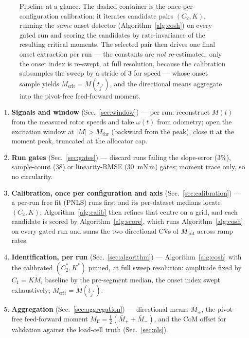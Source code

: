 \documentclass[10pt]{article}
\begin{document}
\begin{figure}[t]
\centering

\caption{Pipeline at a glance. The dashed container is the
once-per-configuration calibration: it iterates candidate pairs
$(C_2, K)$, running the \emph{same} onset detector
(Algorithm~\ref{alg:cosh}) on every gated run and scoring the
candidates by rate-invariance of the resulting critical moments. The
selected pair then drives one final onset extraction per run — the
constants are \emph{not} re-estimated; only the onset index is
re-swept, at full resolution, because the calibration subsamples the
sweep by a stride of $3$ for speed — whose onset sample yields
$M_{\mathrm{crit}} = M(t_{j^\ast})$, and the directional means
aggregate into the pivot-free feed-forward moment.}
\label{fig:flow}
\end{figure}

\begin{enumerate}
\item \textbf{Signals and window} (Sec.~\ref{sec:window}) — per run:
reconstruct $M(t)$ from the measured rotor speeds and take $\omega(t)$
from odometry; open the excitation window at
$|M| > M_{\mathrm{thr}}$ (backward from the peak), close it at the
moment peak, truncated at the allocator cap.
\item \textbf{Run gates} (Sec.~\ref{sec:gates}) — discard runs failing
the slope-error ($3\%$), sample-count ($38$) or linearity-RMSE
($30$~mN\,m) gates; moment trace only, so no circularity.
\item \textbf{Calibration, once per configuration and axis}
(Sec.~\ref{sec:calibration}) — a per-run free fit (PNLS) runs first and
its per-dataset medians locate $(C_2, K)$; Algorithm~\ref{alg:calib}
then refines that centre on a grid, and each candidate is scored by
Algorithm~\ref{alg:score}, which runs Algorithm~\ref{alg:cosh} on
every gated run and sums the two directional CVs of
$M_{\mathrm{crit}}$ across ramp rates.
\item \textbf{Identification, per run} (Sec.~\ref{sec:algorithm}) —
Algorithm~\ref{alg:cosh} with the calibrated $(C_2^\ast, K^\ast)$
pinned, at full sweep resolution: amplitude fixed by $C_1 = K\dot M$,
baseline by the pre-segment median, the onset index swept
exhaustively; $M_{\mathrm{crit}} = M(t_{j^\ast})$.
\item \textbf{Aggregation} (Sec.~\ref{sec:aggregation}) — directional
means $\bar M_{\pm}$, the pivot-free feed-forward moment
$M_{\mathrm{ff}} = \tfrac12(\bar M_{+} + \bar M_{-})$, and the CoM
offset for validation against the load-cell truth
(Sec.~\ref{sec:nls}).
\end{enumerate}
\end{document}

